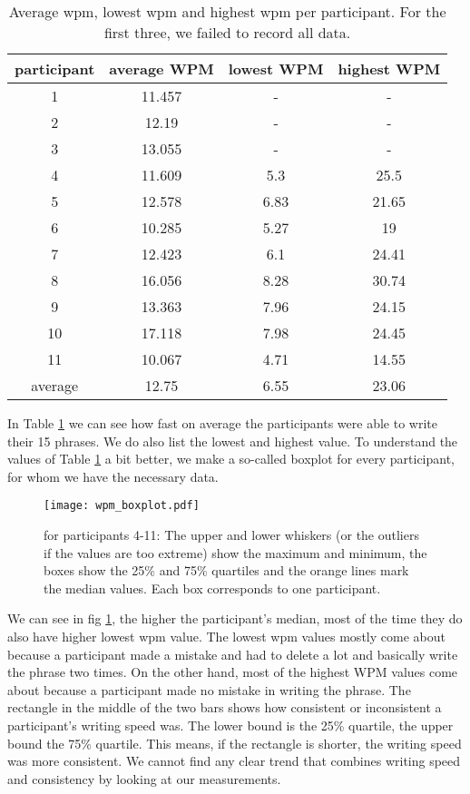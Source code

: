 \begin{table}[ht!]
    \centering
    \caption{Average wpm, lowest wpm and highest wpm per participant. For the first three, we failed to record all data.}
    \begin{tabular}{cccc} \toprule
        participant&average WPM&lowest WPM&highest WPM\\ \midrule
        1 & 11.457 & - & -\\ 
        2 & 12.19 & - & -\\
        3 & 13.055 & - & -\\ 
        4 & 11.609 & 5.3 & 25.5\\
        5 & 12.578 & 6.83 & 21.65\\
        6 & 10.285 & 5.27 & 19\\
        7 & 12.423 & 6.1 & 24.41\\
        8 & 16.056 & 8.28 & 30.74\\
        9 & 13.363 & 7.96 & 24.15\\
        10 & 17.118 & 7.98 & 24.45\\
        11 & 10.067 & 4.71 & 14.55\\
        \bottomrule
        average&12.75&6.55&23.06\\
        \bottomrule
    \end{tabular}
    \label{tab:WPM}
\end{table}
In Table \ref{tab:WPM} we can see how fast on average the participants were able to write their 15 phrases. We do also list the lowest and highest value. To understand the values of Table \ref{tab:WPM} a bit better, we make a so-called boxplot for every participant, for whom we have the necessary data.
\begin{figure}[H]
    \centering
    \texttt{[image: wpm\_boxplot.pdf]}
    \caption{for participants 4-11: The upper and lower whiskers (or the outliers if the values are too extreme) show the maximum and minimum, the boxes show the 25\% and 75\% quartiles and the orange lines mark the median values. Each box corresponds to one participant.}
    \label{fig:WPM}
\end{figure}
We can see in fig \ref{fig:WPM}, the higher the participant's median, most of the time they do also have higher lowest wpm value. The lowest wpm values mostly come about because a participant made a mistake and had to delete a lot and basically write the phrase two times. On the other hand, most of the highest WPM values come about because a participant made no mistake in writing the phrase. The rectangle in the middle of the two bars shows how consistent or inconsistent a participant's writing speed was. The lower bound is the 25\% quartile, the upper bound the 75\% quartile. This means, if the rectangle is shorter, the writing speed was more consistent. We cannot find any clear trend that combines writing speed and consistency by looking at our measurements.\\

